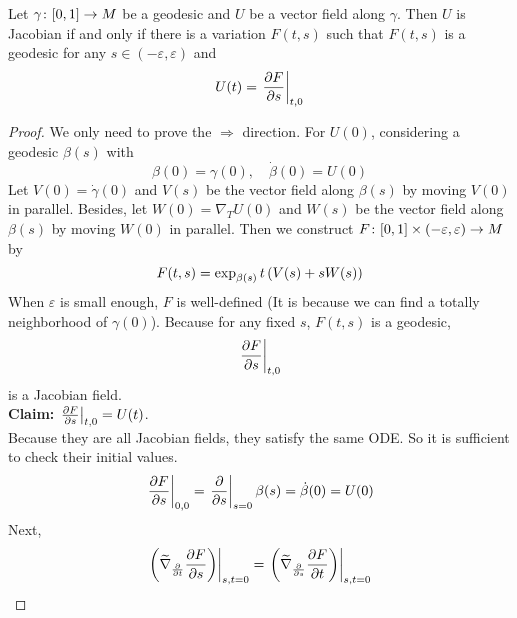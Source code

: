 \begin{enumerate}[label=\arabic{*}.]
	\begin{prop}
		Let $\gamma \colon [0,1] \rightarrow M$ be a geodesic and $U$ be a vector field along $\gamma$. Then $U$ is Jacobian if and only if there is a variation $F(t,s)$ such that $F(t,s)$ is a geodesic for any $s \in (-\varepsilon,\varepsilon)$ and 
		\begin{equation*}
			U(t) = \left.\frac{\partial F}{\partial s}\right\lvert_{t,0}
		\end{equation*}
	\end{prop}
	\begin{proof}
		We only need to prove the $\Rightarrow$ direction. For $U(0)$, considering a geodesic $\beta(s)$ with
		\begin{equation*}
			\beta(0) =\gamma(0),\quad \dot{\beta}(0) = U(0)
		\end{equation*}
		Let $V(0) = \dot{\gamma}(0)$ and $V(s)$ be the vector field along $\beta(s)$ by moving $V(0)$ in parallel. Besides, let $W(0) = \nabla_TU(0)$ and $W(s)$ be the vector field along $\beta(s)$ by moving $W(0)$ in parallel. Then we construct $F \colon [0,1]\times(-\varepsilon,\varepsilon) \rightarrow M$ by
		\begin{equation*}
			F(t,s) = \exp_{\beta(s)}t\left(V(s)+sW(s)\right)
		\end{equation*}
		When $\varepsilon$ is small enough, $F$ is well-defined (It is because we can find a totally neighborhood of $\gamma(0)$). Because for any fixed $s$, $F(t,s)$ is a geodesic,
		\begin{equation*}
			\left.\frac{\partial F}{\partial s}\right\lvert_{t,0}
		\end{equation*}
		is a Jacobian field.\vspace{0.3em}\\
		\noindent \textbf{Claim:} $\left.\frac{\partial F}{\partial s}\right\lvert_{t,0} = U(t)$.\vspace{0.3em}\\
		\noindent Because they are all Jacobian fields, they satisfy the same ODE. So it is sufficient to check their initial values. 
		\begin{equation*}
			\left.\frac{\partial F}{\partial s}\right\lvert_{0,0} = \left.\frac{\partial}{\partial s}\right\lvert_{s=0}\beta(s) = \dot{\beta}(0) = U(0)
		\end{equation*}
		Next,
		\begin{equation*}
			\begin{aligned}
				\lv{\bc{\widetilde{\nabla}_{\frac{\partial}{\partial t}} \frac{\partial F}{\partial s}}}_{s,t=0} &= \lv{\bc{\widetilde{\nabla}_{\frac{\partial}{\partial s}} \frac{\partial F}{\partial t}}}_{s,t=0} \\

\end{aligned}
\end{equation*}
\end{proof}
\end{enumerate}
